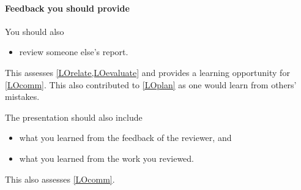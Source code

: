 \paragraph{Feedback you should provide}

You should also
\begin{itemize}
  \item review someone else's report.
\end{itemize}
This assesses \cref{LOrelate,LOevaluate} and provides a learning opportunity 
for \cref{LOcomm}.
This also contributed to \ref{LOplan} as one would learn from others' mistakes.

The presentation should also include
\begin{itemize}
  \item what you learned from the feedback of the reviewer, and
  \item what you learned from the work you reviewed.
\end{itemize}
This also assesses \cref{LOcomm}.

